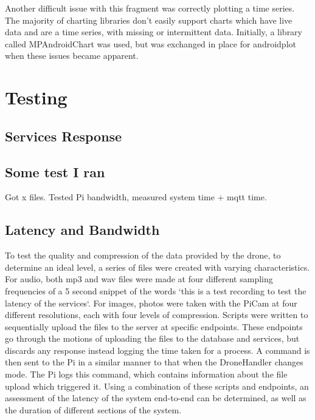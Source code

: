 \documentclass{article}
\begin{document}
Another difficult issue with this fragment was correctly plotting a time series. The majority of charting libraries don't easily support charts which have live data and are a time series, with missing or intermittent data. Initially, a library called MPAndroidChart was used, but was exchanged in place for androidplot when these issues became apparent.   

\section{Testing} \label{Testing}

\subsection{Services Response}

\subsection{Some test I ran}
Got  x files. Tested Pi bandwidth, measured system time + mqtt time. 

\subsection{Latency and Bandwidth}\label{LatencyBandwidth}
To test the quality and compression of the data provided by the drone, to determine an ideal level, a series of files were created with varying characteristics. For audio, both mp3 and wav files were made at four different sampling frequencies of a 5 second snippet of the words `this is a test recording to test the latency of the services`. For images, photos were taken with the PiCam at four different resolutions, each with four levels of compression. Scripts were written to sequentially upload the files to the server at specific endpoints. These endpoints go through the motions of uploading the files to the database and services, but discards any response instead logging the time taken for a process. A command is then sent to the Pi in a similar manner to that when the DroneHandler changes mode. The Pi logs this command, which contains information about the file upload which triggered it. Using a combination of these scripts and endpoints, an assessment of the latency of the system end-to-end can be determined, as well as the duration of different sections of the system. 
\end{document}
